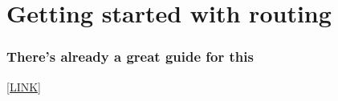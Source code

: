 \section{Getting started with routing}

\frame{\tableofcontents[currentsection]}

\begin{frame}
    \frametitle{There's already a great guide for this}

    \href{https://hexdocs.pm/phoenix/adding_pages.html\#content}{[LINK]}

\end{frame}

